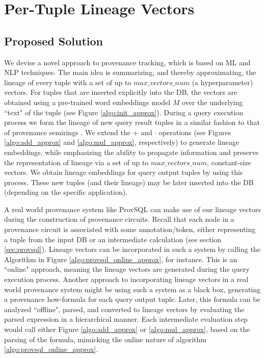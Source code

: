 \chapter{Per-Tuple Lineage Vectors}
\label{chap:per_tuple_lineage_vectors}

\section{Proposed Solution}\label{sec:proposed_solution_approx}
\par We devise a novel approach to provenance tracking, which is based on ML and NLP techniques. The main idea is summarizing, and thereby approximating, the lineage of every tuple with a set of up to $max\_vectors\_num$ (a hyperparameter) vectors. For tuples that are inserted explicitly into the DB, the vectors are obtained using a pre-trained word embeddings model $M$ over the underlying ``text" of the tuple (see Figure \ref{algo:init_approx}).
During a query execution process we form the lineage of new query result tuples in a similar fashion to that of provenance semirings \cite{green2007provenance}. We extend the + and $\cdot$ operations (see Figures \ref{algo:add_approx} and
\ref{algo:mul_approx}, respectively) to generate lineage embeddings, while emphasizing the ability to propagate information and preserve the representation of lineage via a set of up to $max\_vectors\_num$, constant-size vectors. We obtain lineage embeddings for query output tuples by using this process. These new tuples (and their lineage) may be later inserted into the DB (depending on the specific application). 
\par A real world provenance system like ProvSQL \cite{provsql_github} can make use of our lineage vectors during the construction of provenance circuits. Recall that each node in a provenance circuit is associated with some annotation/token, either representing a tuple from the input DB or an intermediate calculation (see section \ref{sec:provsql}). Lineage vectors can be incorporated in such a system by calling the Algorithm in Figure \ref{algo:provsql_online_approx}, for instance. This is an ``online" approach, meaning the lineage vectors are generated during the query execution process. Another approach to incorporating lineage vectors in a real world provenance system might be using such a system as a black box, generating a provenance how-formula for each query output tuple. Later, this formula can be analyzed ``offline", parsed, and converted to lineage vectors by evaluating the parsed expression in a hierarchical manner. Each intermediate evaluation step would call either Figure \ref{algo:add_approx} or \ref{algo:mul_approx}, based on the parsing of the formula, mimicking the online nature of algorithm \ref{algo:provsql_online_approx}.



